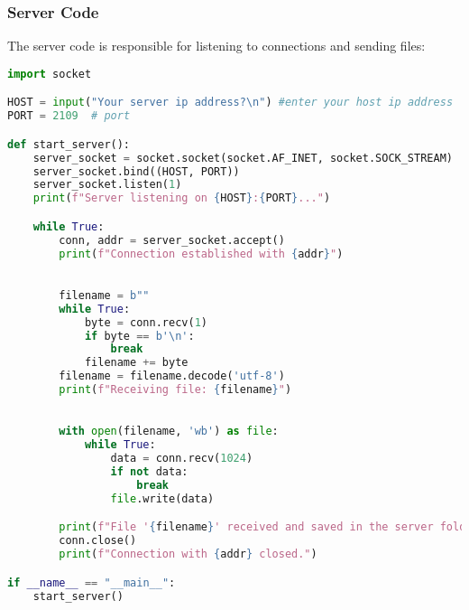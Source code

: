 \documentclass{article}
\begin{document}
\subsubsection{Server Code}
The server code is responsible for listening to connections and sending files:
\begin{lstlisting}[language=Python, caption=Server Code]
import socket

HOST = input("Your server ip address?\n") #enter your host ip address
PORT = 2109  # port

def start_server():
    server_socket = socket.socket(socket.AF_INET, socket.SOCK_STREAM)
    server_socket.bind((HOST, PORT))
    server_socket.listen(1)  
    print(f"Server listening on {HOST}:{PORT}...")

    while True:
        conn, addr = server_socket.accept()
        print(f"Connection established with {addr}")

        
        filename = b""
        while True:
            byte = conn.recv(1)
            if byte == b'\n':  
                break
            filename += byte
        filename = filename.decode('utf-8')  
        print(f"Receiving file: {filename}")

        
        with open(filename, 'wb') as file:
            while True:
                data = conn.recv(1024)
                if not data:  
                    break
                file.write(data)

        print(f"File '{filename}' received and saved in the server folder.")
        conn.close()  
        print(f"Connection with {addr} closed.")

if __name__ == "__main__":
    start_server()

\end{lstlisting}
\end{document}
